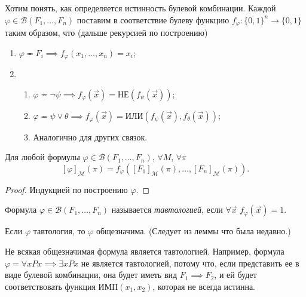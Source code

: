 \documentclass[a4paper, fleqn]{article}
\begin{document}
    Хотим понять, как определяется истинность булевой комбинации.
    Каждой $\varphi \in \mathcal{B}(F_{1}, \ldots, F_{n})$ поставим в соответствие булеву
    функцию $f_{\varphi} \colon \{0, 1\}^{n} \to \{0, 1\}$ таким образом, что (дальше 
    рекурсией по построению)
    \begin{enumerate}
        \item $\varphi \eqcirc F_{i} \implies f_{\varphi}(x_{1}, \ldots, x_{n}) = x_{i}$;
        \item \begin{enumerate}
            \item $\varphi \eqcirc \neg \psi \implies f_{\varphi}(\vec{x}) = 
            \text{НЕ}(f_{\psi}(\vec{x}))$;
            \item $\varphi \eqcirc \psi \lor \theta \implies f_{\varphi}(\vec{x}) = 
            \text{ИЛИ}(f_{\psi}(\vec{x}), f_{\theta}(\vec{x}))$;
            \item Аналогично для других связок.
        \end{enumerate}
    \end{enumerate}
    
    \begin{lemma}
        Для любой формулы $\varphi \in \mathcal{B}(F_{1}, \ldots, F_{n})$, $\forall M$,
         $\forall \pi$
        \[
            [\varphi]_{\mathcal{M}}(\pi) = f_{\varphi}\left([F_{1}]_{\mathcal{M}}(\pi),
             \ldots, [F_{n}]_{\mathcal{M}}(\pi)\right).
        \]
    \end{lemma}
    
    \begin{proof}
        Индукцией по построению $\varphi$.
    \end{proof}
    
    \begin{definition}
        Формула $\varphi \in \mathcal{B}(F_{1}, \ldots, F_{n})$ называется {\it тавтологией}, если $\forall \vec{x}$ $f_{\varphi}(\vec{x}) = 1$.
    \end{definition}
    
    \begin{proposal}
        Если $\varphi$ тавтология, то $\varphi$ общезначима. 
        (Следует из леммы что была недавно.)
    \end{proposal}
    
    Не всякая общезначимая формула является тавтологией.
    Например, формула $\varphi = \forall x Px \implies \exists x Px$ не является 
    тавтологией, потому что, если представить ее в виде булевой комбинации, она будет 
    иметь вид $F_{1} \implies F_{2}$, и ей будет соответствовать функция 
    $\text{ИМП}(x_{1}, x_{2})$, которая не всегда истинна.
    
\end{document}
